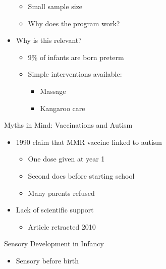 \documentclass[
]{book}
\providecommand{\tightlist}{%
  \setlength{\itemsep}{0pt}\setlength{\parskip}{0pt}}
\begin{document}
\begin{reflect}
\begin{itemize}
  \begin{itemize}
  \tightlist
  \item
    Small sample size\\
  \item
    Why does the program work?\\
  \end{itemize}
\item
  Why is this relevant?

  \begin{itemize}
  \tightlist
  \item
    9\% of infants are born preterm\\
  \item
    Simple interventions available:

    \begin{itemize}
    \tightlist
    \item
      Massage\\
    \item
      Kangaroo care
    \end{itemize}
  \end{itemize}
\end{itemize}

Myths in Mind: Vaccinations and Autism

\begin{itemize}
\tightlist
\item
  1990 claim that MMR vaccine linked to autism

  \begin{itemize}
  \tightlist
  \item
    One dose given at year 1\\
  \item
    Second does before starting school\\
  \item
    Many parents refused\\
  \end{itemize}
\item
  Lack of scientific support

  \begin{itemize}
  \tightlist
  \item
    Article retracted 2010
  \end{itemize}
\end{itemize}

Sensory Development in Infancy

\begin{itemize}
\tightlist
\item
  Sensory before birth


\end{itemize}
\end{reflect}
\end{document}
